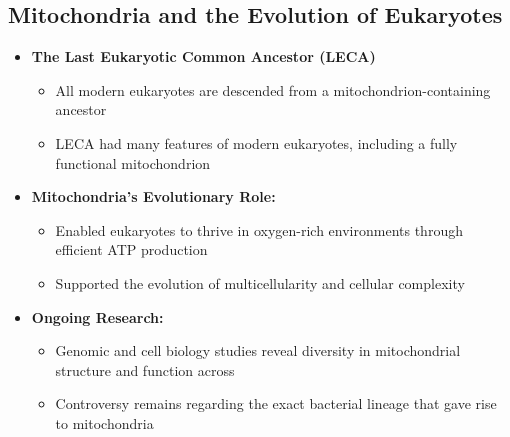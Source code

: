 \documentclass[10pt]{article}
\begin{document}
\subsection*{Mitochondria and the Evolution of Eukaryotes}
\begin{itemize}
	\item \textbf{The Last Eukaryotic Common Ancestor (LECA)}
	\begin{itemize}
        \item All modern eukaryotes are descended from a mitochondrion-containing ancestor
        \item LECA had many features of modern eukaryotes, including a fully functional mitochondrion
    \end{itemize}
	\item \textbf{Mitochondria's Evolutionary Role:}
	\begin{itemize}
        \item Enabled eukaryotes to thrive in oxygen-rich environments through efficient ATP production
        \item Supported the evolution of multicellularity and cellular complexity
    \end{itemize}
	\item \textbf{Ongoing Research:}
	\begin{itemize}
        \item Genomic and cell biology studies reveal diversity in mitochondrial structure and function across
        \item Controversy remains regarding the exact bacterial lineage that gave rise to mitochondria
    \end{itemize}
\end{itemize}
\end{document}
